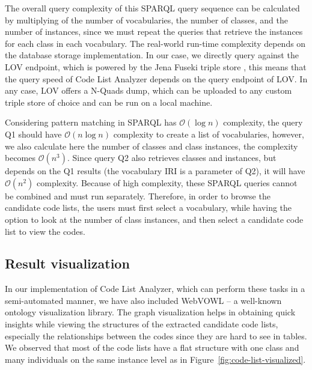 The overall query complexity of this SPARQL query sequence can be calculated by multiplying of the number of vocabularies, the number of classes, and the number of instances, since we must repeat the queries that retrieve the instances for each class in each vocabulary. The real-world run-time complexity depends on the database storage implementation. In our case, we directly query against the LOV endpoint, which is powered by the Jena Fuseki triple store \cite{DBLP:journals/semweb/VandenbusscheAP17}, this means that the query speed of Code List Analyzer depends on the query endpoint of LOV. In any case, LOV offers a N-Quads dump, which can be uploaded to any custom triple store of choice and can be run on a local machine.

Considering pattern matching in SPARQL has $\mathcal{O}(\log{}n)$ complexity, the query Q1 should have $\mathcal{O}(n\log{}n)$ complexity to create a list of vocabularies, however, we also calculate here the number of classes and class instances, the complexity becomes $\mathcal{O}(n^3)$. Since query Q2 also retrieves classes and instances, but  depends on the Q1 results (the vocabulary IRI is a parameter of Q2), it will have $\mathcal{O}(n^2)$ complexity. Because of high complexity, these SPARQL queries cannot be combined and must run separately. Therefore, in order to browse the candidate code lists, the users must first select a vocabulary, while having the option to look at the number of class instances, and then select a candidate code list to view the codes.

\subsection{Result visualization}

In our implementation of Code List Analyzer, which can perform these tasks in a semi-automated manner, we have also included WebVOWL \cite{DBLP:journals/semweb/LohmannNHE15} -- a well-known ontology visualization library. The graph visualization helps in obtaining quick insights while viewing the structures of the extracted candidate code lists, especially the relationships between the codes since they are hard to see in tables. We observed that most of the code lists have a flat structure with one class and many individuals on the same instance level as in Figure~\ref{fig:code-list-visualized}.
